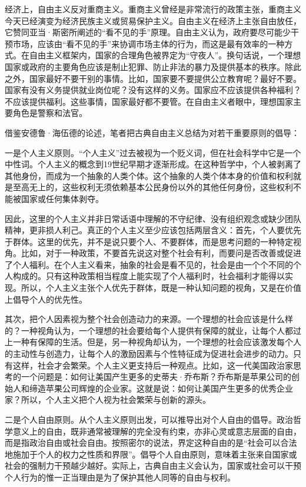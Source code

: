 经济上，自由主义反对重商主义。重商主义曾经是非常流行的政策主张，重商主义今天已经演变为经济民族主义或贸易保护主义。自由主义在经济上主张自由放任，它赞同亚当·斯密所阐述的“看不见的手”原理。自由主义认为，政府要尽可能少干预市场，应该由“看不见的手”来协调市场主体的行为，而这是最有效率的一种方式。在自由主义框架内，国家的合理角色被界定为“守夜人”。换句话说，一个理想国家或政府的主要角色应该是制止犯罪、防止非法的暴力及提供基本的秩序。除此之外，国家最好不要干别的事情。比如，国家要不要提供公立教育呢？最好不要。国家有没有义务提供就业岗位呢？没有这样的义务。国家应不应该提供各种福利？不应该提供福利。这些事情，国家最好都不要管。在自由主义者眼中，理想国家主要角色是警察和法官。

借鉴安德鲁·海伍德的论述，笔者把古典自由主义总结为对若干重要原则的倡导：

一是个人主义原则。“个人主义”过去被视为一个贬义词，但在社会科学中它是一个中性词。个人主义的概念到19世纪早期才逐渐形成。在这种哲学中，个人被剥离了其他身份，而成为一个抽象的人类个体。这个抽象的人类个体本身的价值和权利就是至高无上的，这些权利无须依赖基本公民身份以外的其他任何身份，这些权利不能被国家或任何集体剥夺。

因此，这里的个人主义并非日常话语中理解的不守纪律、没有组织观念或缺少团队精神，更非损人利己。真正的个人主义至少应该包括两层含义：首先，个人要优先于群体。这里的优先，并不是说只要个人、不要群体，而是思考问题的一种特定视角。比如，对于一种政策，不要首先说这对整个社会有利，而要问是否改善或促进了个人福利。在个人主义看来，抽象的社会是看不见的，社会是由一个个不同的个人构成的。只有这种政策相当程度上能实现了个人福利时，社会福利才能得以实现。所以，个人主义主张个人优先于群体，既是一种认知问题的视角，又是在价值上倡导个人的优先性。

其次，把个人因素视为整个社会创造动力的来源。一个理想的社会应该是什么样的？一种视角认为，一个理想的社会要给每个人提供有保障的就业，让每个人都过上一种有保障的生活。但是，另一种视角却认为，一个理想的社会应该激发每个人的主动性与创造力，让每个人的激励因素与个性特征成为促进社会进步的动力。只有这样，社会才会繁荣。个人主义更支持后一种观点。比如，这一代美国政治家思考的一个问题是：如何让美国产生更多的史蒂夫·乔布斯？乔布斯是苹果公司的创始人和缔造苹果公司辉煌的企业家。这就是说：如何让美国产生更多的优秀企业家？所以，个人主义把个人视为社会繁荣与创新的源头。

二是个人自由原则。从个人主义原则出发，可以推导出对个人自由的倡导。政治哲学意义上的自由，既非通常被理解的完全没有约束，亦非心灵或意志层面的自由，而是指政治自由或社会自由。按照密尔的说法，界定这种自由的是“社会可以合法地施加于个人的权力之性质和界限”。倡导个人自由原则，意味着主张来自国家或社会的强制力干预越少越好。实际上，古典自由主义会认为，国家或社会可以干预个人行为的惟一正当理由是为了保护其他人同等的自由与权利。


